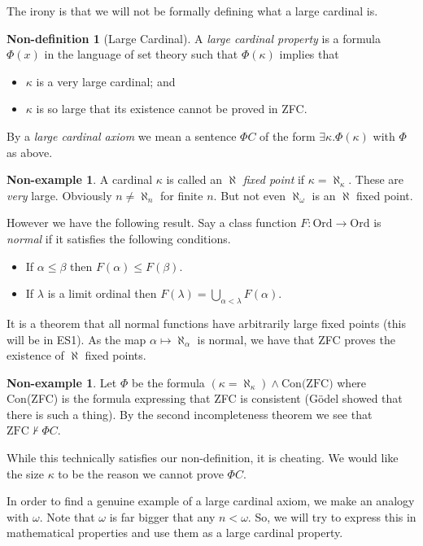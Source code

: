 \documentclass{report}
\theoremstyle{definition}
\theoremstyle{plain}
\theoremstyle{definition}
\newtheorem{nondefn}[thm]{Non-definition}
\newtheorem{noneg}[thm]{Non-example}
\begin{document}
	The irony is that we will not be formally defining what a large cardinal is.
	\begin{nondefn}[Large Cardinal]
		A \emph{large cardinal property} is a formula $\Phi(x)$ in the language of set theory such that $\Phi(\kappa)$ implies that 
		\begin{itemize}
			\item $\kappa$ is a very large cardinal; and
			\item $\kappa$ is so large that its existence cannot be proved in ZFC.
		\end{itemize}
		By a \emph{large cardinal axiom} we mean a sentence $\Phi C$ of the form $\exists \kappa. \Phi(\kappa)$ with $\Phi$ as above.
	\end{nondefn}
	\begin{noneg}
		A cardinal $\kappa$ is called an $\aleph$ \emph{fixed point} if $\kappa = \aleph_\kappa$. These are \emph{very} large. Obviously $n \neq  \aleph_{n}$ for finite $n$. But not even $\aleph_{\omega}$ is an $\aleph$ fixed point.
		
		However we have the following result. Say a class function $F\colon \text{Ord} \to \text{Ord}$ is \emph{normal} if it satisfies the following conditions.
		\begin{itemize}
			\item If $\alpha \leq \beta$ then $F(\alpha) \leq F(\beta)$.
			\item If $\lambda$ is a limit ordinal then $F(\lambda) = \bigcup_{\alpha < \lambda}F(\alpha)$.
		\end{itemize}
		It is a theorem that all normal functions have arbitrarily large fixed points (this will be in ES1). As the map $\alpha \mapsto \aleph_\alpha$ is normal, we have that ZFC proves the existence of $\aleph$ fixed points.
	\end{noneg}
	\begin{noneg}
		Let $\Phi$ be the formula $(\kappa =  \aleph_{\kappa}) \wedge \text{Con(ZFC)}$ where Con(ZFC) is the formula expressing that ZFC is consistent (Gödel showed that there is such a thing). By the second incompleteness theorem we see that $\text{ZFC}\nvdash \Phi C$. 
		
		While this technically satisfies our non-definition, it is cheating. We would like the size $\kappa$ to be the reason we cannot prove $\Phi C$.
	\end{noneg}
	In order to find a genuine example of a large cardinal axiom, we make an analogy with $\omega$. Note that $\omega$ is far bigger that any $n<\omega$. So, we will try to express this in mathematical properties and use them as a large cardinal property.
\end{document}
